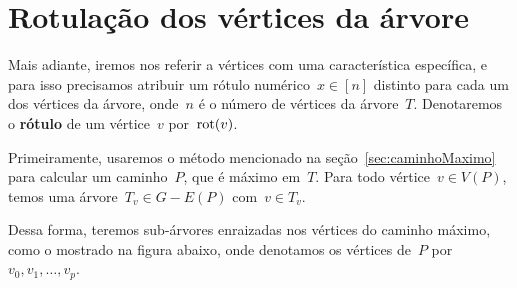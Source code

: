 \section {Rotulação dos vértices da árvore}
\label{sec:rotulacao}

	Mais adiante, iremos nos referir a vértices com uma 
	característica específica, e para isso precisamos atribuir um 
	rótulo numérico~$x\in [n]$ distinto para cada um dos vértices 
	da árvore, onde~$n$ é o número de vértices da árvore~$T$. 
	Denotaremos o \textbf{rótulo} de um vértice~$v$ por~$\mathrm{rot}(v)$.

	Primeiramente, usaremos o método mencionado na 
	seção~\ref{sec:caminhoMaximo} para calcular 
	um caminho~$P$, que é máximo em~$T$. 
	Para todo vértice~$v\in V(P)$, temos uma 
	árvore~$T_v \in G - E(P)$ com~$v\in T_v$.

	Dessa forma, teremos sub-árvores enraizadas nos vértices do
	caminho máximo, como o mostrado na figura abaixo, onde denotamos
	os vértices de~$P$ por~${v_0,v_1,\ldots,v_p}$.
	

